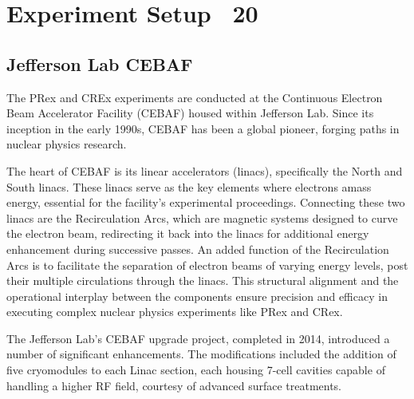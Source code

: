 \chapter{Experiment Setup ~20}

\section{Jefferson Lab CEBAF}

The PRex and CREx experiments are conducted at the Continuous Electron Beam Accelerator Facility (CEBAF) housed within Jefferson Lab. Since its inception in the early 1990s, CEBAF has been a global pioneer, forging paths in nuclear physics research.

The heart of CEBAF is its linear accelerators (linacs), specifically the North and South linacs. These linacs serve as the key elements where electrons amass energy, essential for the facility's experimental proceedings. Connecting these two linacs are the Recirculation Arcs, which are magnetic systems designed to curve the electron beam, redirecting it back into the linacs for additional energy enhancement during successive passes. An added function of the Recirculation Arcs is to facilitate the separation of electron beams of varying energy levels, post their multiple circulations through the linacs. This structural alignment and the operational interplay between the components ensure precision and efficacy in executing complex nuclear physics experiments like PRex and CRex.



The Jefferson Lab's CEBAF upgrade project, completed in 2014, introduced a number of significant enhancements. The modifications included the addition of five cryomodules to each Linac section, each housing 7-cell cavities capable of handling a higher RF field, courtesy of advanced surface treatments.

